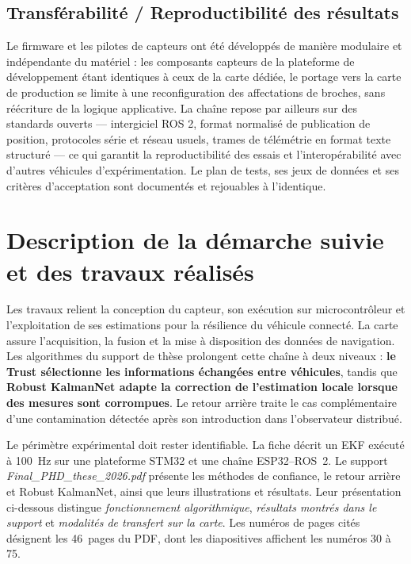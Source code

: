 \documentclass[11pt,a4paper]{article}
\renewcommand{\strong}[1]{\textbf{#1}}
\begin{document}
\subsection{Transférabilité / Reproductibilité des résultats}

Le firmware et les pilotes de capteurs ont été développés de manière modulaire et indépendante du matériel : les composants capteurs de la plateforme de développement étant identiques à ceux de la carte dédiée, le portage vers la carte de production se limite à une reconfiguration des affectations de broches, sans réécriture de la logique applicative. La chaîne repose par ailleurs sur des standards ouverts — intergiciel ROS 2, format normalisé de publication de position, protocoles série et réseau usuels, trames de télémétrie en format texte structuré — ce qui garantit la reproductibilité des essais et l’interopérabilité avec d’autres véhicules d’expérimentation. Le plan de tests, ses jeux de données et ses critères d’acceptation sont documentés et rejouables à l’identique.


\clearpage
\section{Description de la démarche suivie et des travaux réalisés}
\label{sec:travaux}

Les travaux relient la conception du capteur, son exécution sur microcontrôleur et l'exploitation de ses estimations pour la résilience du véhicule connecté. La carte assure l'acquisition, la fusion et la mise à disposition des données de navigation. Les algorithmes du support de thèse prolongent cette chaîne à deux niveaux : \strong{le Trust sélectionne les informations échangées entre véhicules}, tandis que \strong{Robust KalmanNet adapte la correction de l'estimation locale lorsque des mesures sont corrompues}. Le retour arrière traite le cas complémentaire d'une contamination détectée après son introduction dans l'observateur distribué.

Le périmètre expérimental doit rester identifiable. La fiche décrit un EKF exécuté à 100~Hz sur une plateforme STM32 et une chaîne ESP32--ROS~2. Le support \emph{Final\_PHD\_these\_2026.pdf} présente les méthodes de confiance, le retour arrière et Robust KalmanNet, ainsi que leurs illustrations et résultats. Leur présentation ci-dessous distingue \emph{fonctionnement algorithmique}, \emph{résultats montrés dans le support} et \emph{modalités de transfert sur la carte}. Les numéros de pages cités désignent les 46~pages du PDF, dont les diapositives affichent les numéros 30 à 75.
\end{document}
